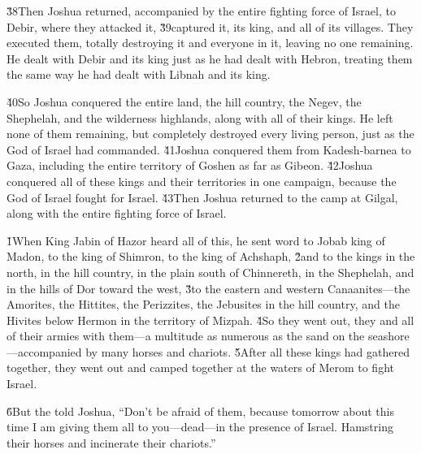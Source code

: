 \v{38}Then Joshua returned, accompanied by the entire fighting force of Israel, to Debir, where they attacked it, \v{39}captured it, its king, and all of its villages. They executed them, totally destroying it and everyone in it, leaving no one remaining. He dealt with Debir and its king just as he had dealt with Hebron, treating them the same way he had dealt with Libnah and its king.

\v{40}So Joshua conquered the entire land, the hill country, the Negev, the Shephelah, and the wilderness highlands, along with all of their kings. He left none of them remaining, but completely destroyed every living person, just as the  God of Israel had commanded. \v{41}Joshua conquered them from Kadesh-barnea to Gaza, including the entire territory of Goshen as far as Gibeon. \v{42}Joshua conquered all of these kings and their territories in one campaign, because the  God of Israel fought for Israel. \v{43}Then Joshua returned to the camp at Gilgal, along with the entire fighting force of Israel.

\v{1}When King Jabin of Hazor heard all of this, he sent word to Jobab king of Madon, to the king of Shimron, to the king of Achshaph, \v{2}and to the kings in the north, in the hill country, in the plain south of Chinnereth, in the Shephelah, and in the hills of Dor toward the west, \v{3}to the eastern and western Canaanites---the Amorites, the Hittites, the Perizzites, the Jebusites in the hill country, and the Hivites below Hermon in the territory of Mizpah. \v{4}So they went out, they and all of their armies with them---a multitude as numerous as the sand on the seashore---accompanied by many horses and chariots. \v{5}After all these kings had gathered together, they went out and camped together at the waters of Merom to fight Israel.

\v{6}But the  told Joshua, ``Don't be afraid of them, because tomorrow about this time I am giving them all to you---dead---in the presence of Israel. Hamstring their horses and incinerate their chariots.''

